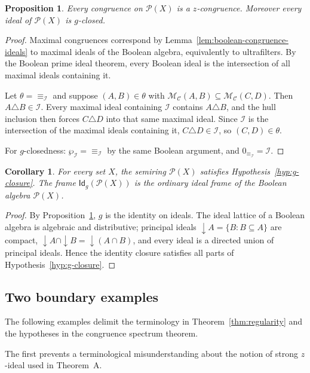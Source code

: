 \documentclass[11pt,leqno]{amsart}
\theoremstyle{plain}
\newtheorem{proposition}[theorem]{Proposition}
\newtheorem{corollary}[theorem]{Corollary}
\theoremstyle{definition}
\theoremstyle{remark}
\numberwithin{equation}{section}
\newcommand{\GCl}{\mathsf{Id}_{g}}
\newcommand{\MC}{\mathcal M_{\mathcal C}}
\newcommand{\zero}[1]{0_{#1}}
\begin{document}
\begin{proposition}\label{prop:boolean-all-zcong}
Every congruence on $\mathcal{P}(X)$ is a $z$-congruence.
Moreover every ideal of $\mathcal{P}(X)$ is $g$-closed.
\end{proposition}
\begin{proof}
Maximal congruences correspond by Lemma~\ref{lem:boolean-congruence-ideals}
to maximal ideals of the Boolean algebra, equivalently to ultrafilters.
By the Boolean prime ideal theorem, every Boolean ideal is the
intersection of all maximal ideals containing it.

Let $\theta=\equiv_{\mathcal{I}}$ and suppose $(A,B)\in\theta$ with
$\MC(A,B)\subseteq\MC(C,D)$.
Then $A\triangle B\in\mathcal{I}$.
Every maximal ideal containing $\mathcal{I}$ contains $A\triangle B$,
and the hull inclusion then forces $C\triangle D$ into that same
maximal ideal.
Since $\mathcal{I}$ is the intersection of the maximal ideals
containing it, $C\triangle D\in\mathcal{I}$, so $(C,D)\in\theta$.

For $g$-closedness: $\wp_{\mathcal{I}}=\equiv_{\mathcal{I}}$
by the same Boolean argument, and $\zero{\equiv_{\mathcal{I}}}=\mathcal{I}$.
\end{proof}

\begin{corollary}\label{cor:boolean-g-hypothesis}
For every set $X$, the semiring $\mathcal{P}(X)$ satisfies
Hypothesis~\ref{hyp:g-closure}.
The frame $\GCl(\mathcal{P}(X))$ is the ordinary ideal frame of
the Boolean algebra $\mathcal{P}(X)$.
\end{corollary}
\begin{proof}
By Proposition~\ref{prop:boolean-all-zcong}, $g$ is the identity on
ideals.
The ideal lattice of a Boolean algebra is algebraic and distributive;
principal ideals $\downarrow A=\{B:B\subseteq A\}$ are compact,
$\downarrow A\cap\downarrow B=\downarrow(A\cap B)$, and every ideal
is a directed union of principal ideals.
Hence the identity closure satisfies all parts of
Hypothesis~\ref{hyp:g-closure}.
\end{proof}

\subsection{Two boundary examples}

The following examples delimit the terminology in
Theorem~\ref{thm:regularity} and the hypotheses in the
congruence spectrum theorem.

The first prevents a terminological misunderstanding about the notion
of strong $z$-ideal used in Theorem~A.
\end{document}
